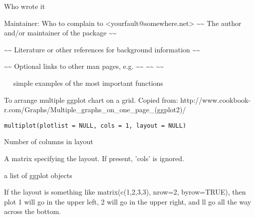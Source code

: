 \documentclass[a4paper]{book}
\begin{document}
%
\begin{Author}\relax
Who wrote it

Maintainer: Who to complain to <yourfault@somewhere.net>
\textasciitilde{}\textasciitilde{} The author and/or maintainer of the package \textasciitilde{}\textasciitilde{}
\end{Author}
%
\begin{References}\relax
\textasciitilde{}\textasciitilde{} Literature or other references for background information \textasciitilde{}\textasciitilde{}
\end{References}
%
\begin{SeeAlso}\relax
\textasciitilde{}\textasciitilde{} Optional links to other man pages, e.g. \textasciitilde{}\textasciitilde{}
\textasciitilde{}\textasciitilde{}  \textasciitilde{}\textasciitilde{}
\end{SeeAlso}
%
\begin{Examples}
\begin{ExampleCode}
~~ simple examples of the most important functions ~~
\end{ExampleCode}
\end{Examples}
%
\begin{Description}\relax
To arrange multiple ggplot chart on a grid. Copied from: http://www.cookbook-r.com/Graphs/Multiple\_graphs\_on\_one\_page\_(ggplot2)/
\end{Description}
%
\begin{Usage}
\begin{verbatim}
multiplot(plotlist = NULL, cols = 1, layout = NULL)
\end{verbatim}
\end{Usage}
%
\begin{Arguments}
\begin{ldescription}
\item[\code{cols}] Number of columns in layout

\item[\code{layout}] A matrix specifying the layout. If present, 'cols' is ignored.

\item[\code{plots}] a list of ggplot objects
\end{ldescription}
\end{Arguments}
%
\begin{Details}\relax
If the layout is something like matrix(c(1,2,3,3), nrow=2, byrow=TRUE), then plot 1 will go in the upper left, 2 will go in the upper right, and ll go all the way across the bottom.
\end{Details}
\end{document}
